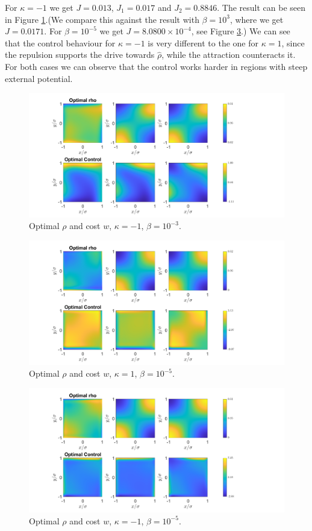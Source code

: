\documentclass[11pt, a4paper]{article}
\theoremstyle{definition}
\newcommand{\hr}{\widehat \rho}
\begin{document}
	For $\kappa = -1$ we get $J = 0.013$, $J_1 = 0.017$ and $J_2 = 0.8846$. The result can be seen in Figure \ref{F1b}.(We compare this against the result with $\beta = 10^3$, where we get $J = 0.0171$. For $\beta = 10^{-5}$ we get $J = 8.0800 \times 10^{-4}$, see Figure \ref{F1d}.)
	We can see that the control behaviour for $\kappa = -1$ is very different to the one for $\kappa = 1$, since the repulsion supports the drive towards $\hr$, while the attraction counteracts it. For both cases we can observe that the control works harder in regions with steep external potential.
	\begin{figure}[h]
		\centering
		\includegraphics[scale=0.35]{SCEx1kn1.png}
		\caption{Optimal $\rho$ and cost $w$, $\kappa = - 1$, $\beta = 10^{-3}$.} 
		\label{F1b}
	\end{figure}

	\begin{figure}[h]
		\centering
		\includegraphics[scale=0.35]{SCEx1k1b5.png}
		\caption{Optimal $\rho$ and cost $w$, $\kappa = 1$, $\beta = 10^{-5}$.} 
		\label{F1c}
	\end{figure}
	\begin{figure}[h]
		\centering
		\includegraphics[scale=0.35]{SCEx1kn1b5.png}
		\caption{Optimal $\rho$ and cost $w$, $\kappa = - 1$, $\beta = 10^{-5}$.} 
		\label{F1d}
	\end{figure}
\end{document}
